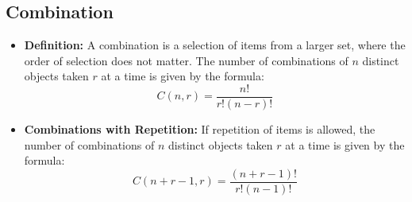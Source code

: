 \subsection{Combination}

\begin{itemize}
    \item \textbf{Definition: } A combination is a selection of items from a larger set, where the order of selection does not matter. The number of combinations of $n$ distinct objects taken $r$ at a time is given by the formula:
          $$ C(n, r) = \frac{n!}{r!(n-r)!} $$
    \item \textbf{Combinations with Repetition: } If repetition of items is allowed, the number of combinations of $n$ distinct objects taken $r$ at a time is given by the formula:
          $$ C(n + r - 1, r) = \frac{(n + r - 1)!}{r!(n - 1)!} $$
\end{itemize}
